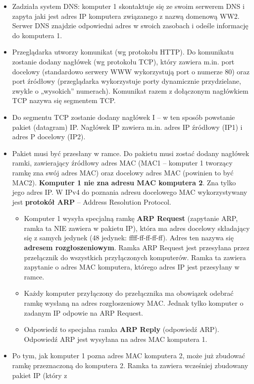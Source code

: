 \documentclass[a4paper]{article}
\begin{document}
\begin{itemize}
    \item Zadziała system DNS: komputer	1 skontaktuje się ze swoim serwerem	DNS i zapyta jaki jest adres IP	komputera związanego z nazwą domenową WW2. Serwer DNS znajdzie	odpowiedni adres w swoich zasobach i odeśle informację do	komputera 1.
    \item Przeglądarka utworzy komunikat (wg protokołu	HTTP).	Do komunikatu zostanie dodany nagłówek	(wg	protokołu TCP),	który zawiera m.in.	port docelowy (standardowo	serwery
    WWW	wykorzystują port o numerze	80)	oraz port źródłowy (przeglądarka wykorzystuje porty	dynamicznie	przydzielane, zwykle o „wysokich” numerach). Komunikat razem z dołączonym	nagłówkiem	TCP	nazywa	się	segmentem	TCP.
    \item Do segmentu TCP zostanie dodany nagłówek I – w ten sposób	powstanie pakiet (datagram) IP.	Nagłówek IP	zawiera	m.in. adres	IP	źródłowy (IP1) i adres P docelowy (IP2).
    \item Pakiet  musi być przesłany w ramce. Do pakietu musi zostać dodany nagłówek ramki, zawierający	źródłowy adres MAC (MAC1 – komputer	1 tworzący ramkę zna swój adres	MAC)	 oraz docelowy adres	MAC (powinien to być MAC2). \textbf{Komputer 1 nie zna adresu MAC komputera 2}. Zna	 tylko jego	 adres IP. W IPv4 do poznania adresu docelowego MAC wykorzystywany jest \textbf{protokół ARP} – Address	 Resolution	 Protocol.
    \begin{itemize}
        \item Komputer 1 wysyła specjalną ramkę	\textbf{ARP Request} (zapytanie	ARP, ramka ta NIE zawiera w	pakietu	IP), która ma adres	docelowy składający	się	z samych jedynek (48	jedynek: ffff-ff-ff-ff-ff).	Adres	ten	nazywa	się	\textbf{adresem	rozgłoszeniowym}. Ramka ARP Request jest przesyłana przez przełącznik do wszystkich przyłączonych komputerów. Ramka ta zawiera zapytanie o adres MAC	komputera,	którego adres IP jest przesyłany w ramce.
        \item Każdy	komputer przyłączony do	przełącznika ma	obowiązek odebrać ramkę	wysłaną na	adres rozgłoszeniowy MAC. Jednak tylko komputer o zadanym IP odpowie na ARP Request.
        \item Odpowiedź to	specjalna ramka \textbf{ARP	Reply}	(odpowiedź	ARP).	Odpowiedź	ARP	jest wysyłana na adres MAC komputera 1.
    \end{itemize}
    \item Po tym, jak komputer 1 pozna adres MAC komputera 2, może już zbudować ramkę przeznaczoną do komputera 2. Ramka ta zawiera wcześniej zbudowany pakiet IP (który z

\end{itemize}
\end{document}
